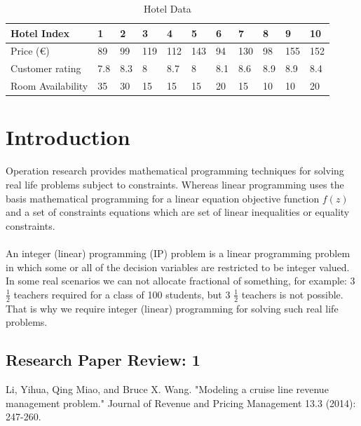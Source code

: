 \documentclass[paper=a4, fontsize=11pt]{scrartcl} %
\begin{document}
\begin{table}[ht]
\centering
\begin{tabular}{@{}|l|l|l|l|l|l|l|l|l|l|l|@{}}
\toprule
Hotel Index       & 1   & 2   & 3   & 4   & 5   & 6   & 7   & 8   & 9   & 10  \\ \midrule
Price (\euro)     & 89  & 99  & 119 & 112 & 143 & 94  & 130 & 98  & 155 & 152 \\ \midrule
Customer rating   & 7.8 & 8.3 & 8   & 8.7 & 8   & 8.1 & 8.6 & 8.9 & 8.9 & 8.4 \\ \midrule
Room Availability & 35  & 30  & 15  & 15  & 15  & 20  & 15  & 10  & 10  & 20  \\ \bottomrule
\end{tabular}
\caption{Hotel Data}
\label{hoteldata}
\end{table}



\section{Introduction}

Operation research provides mathematical programming techniques for solving real life problems subject to constraints. Whereas linear programming uses the basis mathematical programming for a linear equation objective function $f(z)$ and a set of constraints equations which are set of linear inequalities or equality  constraints.
\\
\\
An integer (linear) programming (IP) problem is a linear programming problem in which some or all of the decision variables are restricted to be integer valued. In some real scenarios we can not allocate fractional of something, for example: 3 $\frac{1}{2}$ teachers required for a class of 100 students, but 3 $\frac{1}{2}$ teachers is not possible. That is why we require integer (linear) programming for solving such real life problems.
\\

\subsection{Research Paper Review: 1}
Li, Yihua, Qing Miao, and Bruce X. Wang. "Modeling a cruise line revenue management problem." Journal of Revenue and Pricing Management 13.3 (2014): 247-260. \\
\end{document}
